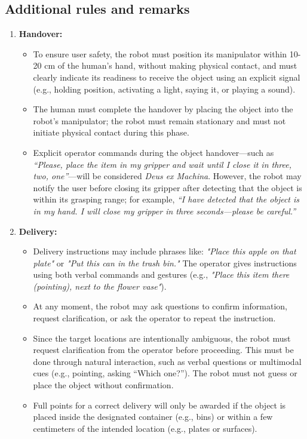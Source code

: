 \subsection*{Additional rules and remarks}
\begin{enumerate}[nosep]
	\item \textbf{Handover:}
	\begin{itemize}[nosep]
		\item To ensure user safety, the robot must position its manipulator within 10-20 cm of the human's hand, without making physical contact, and must clearly indicate its readiness to receive the object using an explicit signal (e.g., holding position, activating a light, saying it, or playing a sound).
		\item The human must complete the handover by placing the object into the robot's manipulator; the robot must remain stationary and must not initiate physical contact during this phase.
		\item Explicit operator commands during the object handover—such as \textit{“Please, place the item in my gripper and wait until I close it in three, two, one”}—will be considered \textit{Deus ex Machina}. However, the robot may notify the user before closing its gripper after detecting that the object is within its grasping range; for example, \textit{“I have detected that the object is in my hand. I will close my gripper in three seconds—please be careful.”}
	\end{itemize}
	\item \textbf{Delivery:}
	\begin{itemize}[nosep]
		\item Delivery instructions may include phrases like: \textit{"Place this apple on that plate"} or \textit{"Put this can in the trash bin."} The operator gives instructions using both verbal commands and gestures (e.g., \textit{"Place this item there} \textit{(pointing), next to the flower vase"}).
		\item At any moment, the robot may ask questions to confirm information, request clarification, or ask the operator to repeat the instruction.
		\item Since the target locations are intentionally ambiguous, the robot must request clarification from the operator before proceeding. This must be done through natural interaction, such as verbal questions or multimodal cues (e.g., pointing, asking “Which one?”). The robot must not guess or place the object without confirmation.
		\item Full points for a correct delivery will only be awarded if the object is placed inside the designated container (e.g., bins) or within a few centimeters of the intended location (e.g., plates or surfaces).

\end{itemize}
\end{enumerate}
